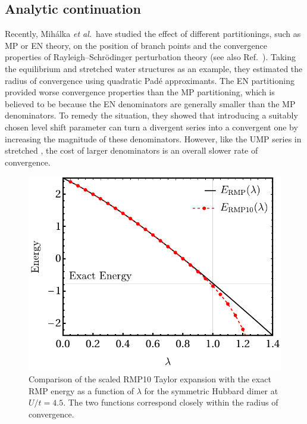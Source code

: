 \documentclass[aps,prb,reprint,noshowkeys,superscriptaddress]{revtex4-1}
\newcommand{\etal}{\textit{et al.}}
\begin{document}
\subsection{Analytic continuation}

Recently, Mih\'alka \etal\ have studied the effect of different partitionings, such as MP or EN theory, on the position of 
branch points and the convergence properties of Rayleigh--Schr\"odinger perturbation theory\cite{Mihalka_2017b} (see also
Ref.~).
Taking the equilibrium and stretched water structures as an example, they estimated the radius of convergence using quadratic
Pad\'e approximants.
The EN partitioning provided worse convergence properties than the MP partitioning, which is believed to be
because the EN denominators are generally smaller than the MP denominators.
To remedy the situation, they showed that introducing a suitably chosen level shift parameter can turn a 
divergent series into a convergent one by increasing the magnitude of these denominators.\cite{Mihalka_2017b}
However, like the UMP series in stretched ,\cite{Lepetit_1988} 
the cost of larger denominators is an overall slower rate of convergence.

\begin{figure}
    \includegraphics[width=\linewidth]{fig12}
    \caption{%
        Comparison of the scaled RMP10 Taylor expansion with the exact RMP energy as a function
        of $\lambda$ for the symmetric Hubbard dimer at $U/t = 4.5$. 
        The two functions correspond closely within the radius of convergence.
    }
    \label{fig:rmp_anal_cont}
\end{figure}
\end{document}
